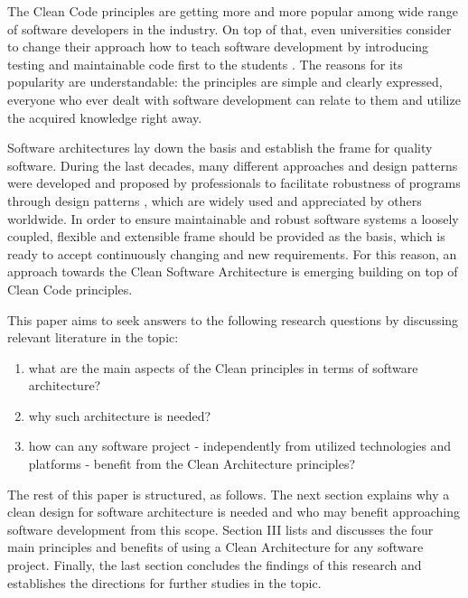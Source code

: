 \documentclass[conference]{IEEEtran}
\begin{document}
The Clean Code principles are getting more and more popular among wide range of software developers in the industry. On top of that, even universities consider to change their approach how to teach software development by introducing testing and maintainable code first to the students \cite{studentscleancode}. The reasons for its popularity are understandable: the principles are simple and clearly expressed, everyone who ever dealt with software development can relate to them and utilize the acquired knowledge right away. 

Software architectures lay down the basis and establish the frame for quality software. During the last decades, many different approaches and design patterns were developed and proposed by professionals to facilitate robustness of programs through design patterns \cite{codecomplete} \cite{onionarchitecture} \cite{gof}, which are widely used and appreciated by others worldwide. In order to ensure maintainable and robust software systems a loosely coupled, flexible and extensible frame should be provided as the basis, which is ready to accept continuously changing and new requirements. For this reason, an approach towards the Clean Software Architecture is emerging \cite{cleanarchitecture} building on top of Clean Code principles. 

This paper aims to seek answers to the following research questions by discussing relevant literature in the topic: 

\setdefaultleftmargin{40pt}{}{}{}{}{}
\begin{enumerate}[label=RQ\arabic*:]
	\item what are the main aspects of the Clean principles in terms of software architecture?
	\item why such architecture is needed?
	\item how can any software project - independently from utilized technologies and platforms - benefit from the Clean Architecture principles?
\end{enumerate}  

The rest of this paper is structured, as follows. The next section explains why a clean design for software architecture is needed and who may benefit approaching software development from this scope. Section III lists and discusses the four main principles and benefits of using a Clean Architecture for any software project. Finally, the last section concludes the findings of this research and establishes the directions for further studies in the topic. 
\end{document}
